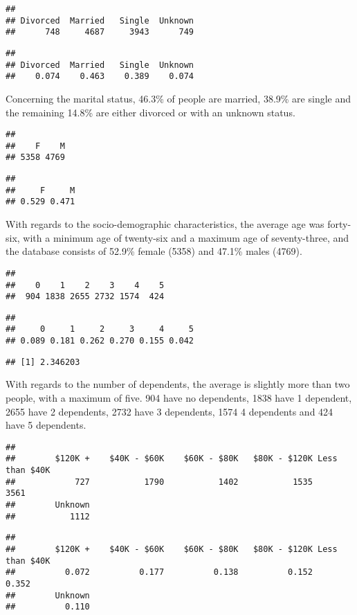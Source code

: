 \documentclass[
]{article}
\begin{document}
\begin{verbatim}
## 
## Divorced  Married   Single  Unknown 
##      748     4687     3943      749
\end{verbatim}

\begin{verbatim}
## 
## Divorced  Married   Single  Unknown 
##    0.074    0.463    0.389    0.074
\end{verbatim}

Concerning the marital status, 46.3\% of people are married, 38.9\% are
single and the remaining 14.8\% are either divorced or with an unknown
status.

\begin{verbatim}
## 
##    F    M 
## 5358 4769
\end{verbatim}

\begin{verbatim}
## 
##     F     M 
## 0.529 0.471
\end{verbatim}

With regards to the socio-demographic characteristics, the average age
was forty-six, with a minimum age of twenty-six and a maximum age of
seventy-three, and the database consists of 52.9\% female (5358) and
47.1\% males (4769).

\begin{verbatim}
## 
##    0    1    2    3    4    5 
##  904 1838 2655 2732 1574  424
\end{verbatim}

\begin{verbatim}
## 
##     0     1     2     3     4     5 
## 0.089 0.181 0.262 0.270 0.155 0.042
\end{verbatim}

\begin{verbatim}
## [1] 2.346203
\end{verbatim}

With regards to the number of dependents, the average is slightly more
than two people, with a maximum of five. 904 have no dependents, 1838
have 1 dependent, 2655 have 2 dependents, 2732 have 3 dependents, 1574 4
dependents and 424 have 5 dependents.

\begin{verbatim}
## 
##        $120K +    $40K - $60K    $60K - $80K   $80K - $120K Less than $40K 
##            727           1790           1402           1535           3561 
##        Unknown 
##           1112
\end{verbatim}

\begin{verbatim}
## 
##        $120K +    $40K - $60K    $60K - $80K   $80K - $120K Less than $40K 
##          0.072          0.177          0.138          0.152          0.352 
##        Unknown 
##          0.110
\end{verbatim}
\end{document}

